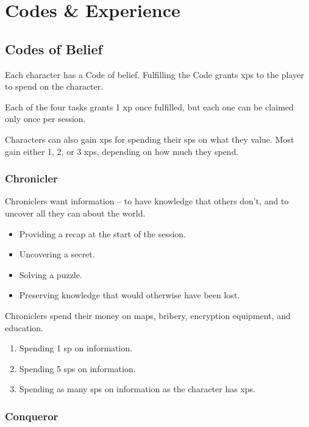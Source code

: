 \chapter[The Soldier's Code]{Codes \& Experience}
\label{codes}

\section{Codes of Belief}
\label{listOfCodes}

\begin{multicols}{2}
\noindent
Each character has a Code of belief.
Fulfilling the Code grants \glspl{xp} to the player to spend on the character.

Each of the four tasks grants 1 \gls{xp} once fulfilled, but each one can be claimed only once per session.

Characters can also gain \glspl{xp} for spending their \glspl{sp} on what they value.
Most gain either 1, 2, or 3 \glspl{xp}, depending on how much they spend.

\subsection{Chronicler}

Chroniclers want information -- to have knowledge that others don't, and to uncover all they can about the world.

\begin{itemize}
  \item
  Providing a recap at the start of the session.
  \item
  Uncovering a secret.
  \item
  Solving a puzzle.
  \item
  Preserving knowledge that would otherwise have been lost.
\end{itemize}

Chroniclers spend their money on maps, bribery, encryption equipment, and education.

\begin{enumerate}
  \item
  Spending 1 \gls{sp} on information.
  \item
  Spending 5 \glspl{sp} on information.
  \item
  Spending as many \glspl{sp} on information as the character has \glspl{xp}.
\end{enumerate}

\subsection{Conqueror}


\end{multicols}
